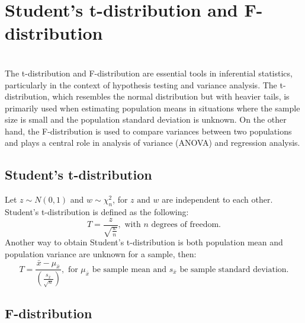 \section{Student's t-distribution and F-distribution}\\

\noindent
The t-distribution and F-distribution are essential tools in inferential statistics, particularly in the context of hypothesis testing and variance analysis. The t-distribution, which resembles the normal distribution but with heavier tails, is primarily used when estimating population means in situations where the sample size is small and the population standard deviation is unknown. On the other hand, the F-distribution is used to compare variances between two populations and plays a central role in analysis of variance (ANOVA) and regression analysis.\\

\noindent
\subsection{Student's t-distribution}

\begin{definition}
Let $z \sim N(0,1)$ and $w \sim \chi_{n}^{2}$, for $z \text{ and } w$ are independent to each other. Student's t-distribution is defined as the following: \[ T = \frac{z}{\sqrt{\frac{w}{n}}}, \text{ with $n$ degrees of freedom.}\]
Another way to obtain Student's t-distribution is both population mean and population variance are unknown for a sample, then: \[ T = \frac{\bar{x} - \mu_{\bar{x}}}{ (\frac{s_{\bar{x}}}{\sqrt{n}})}, \text{ for $\mu_{\bar{x}}$ be sample mean and $s_{\bar{x}}$ be sample standard deviation.}\]
\end{definition}

\subsection{F-distribution}











